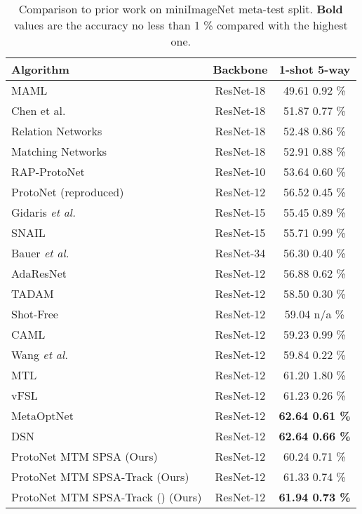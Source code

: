 \documentclass{article}
\begin{document}
\begin{table*}[th]
	\caption{Comparison to prior work on miniImageNet meta-test split. {\bf Bold} values are the accuracy no less than 1 \% compared with the highest one.} 
	\label{table:all-mini-imagenet}
	\begin{center}
		\begin{tabular}{|p{6.5 cm}|c|c|}
			\hline
			Algorithm & Backbone & 1-shot 5-way \\
			\hline
 			MAML~\cite{finn2017model,chen2019closer} & \; ResNet-18 \; & 49.61  0.92 \% \\
 			Chen et al.~\cite{chen2019closer} & ResNet-18 & 51.87  0.77 \%  \\
 			Relation Networks~\cite{sung2018learning,chen2019closer} &  ResNet-18 & 52.48  0.86 \%  \\
 			Matching Networks~\cite{vinyals2016matching,chen2019closer} & ResNet-18 & 52.91  0.88 \%  \\
			RAP-ProtoNet~\cite{hong2021reinforced} & ResNet-10 & 53.64  0.60 \% \\
ProtoNet (reproduced)~\cite{NIPS2017_cb8da676} & ResNet-12 & 56.52  0.45 \%  \\
 			Gidaris  {\it et al.}~\cite{gidaris2018dynamic} & ResNet-15 & 55.45  0.89 \% \\
			SNAIL~\cite{mishra2017simple} & ResNet-15 &  55.71  0.99 \% \\
			Bauer  {\it et al.}~\cite{bauer2017discriminative} & ResNet-34 &  56.30  0.40 \%  \\
			AdaResNet~\cite{munkhdalai2018rapid} & ResNet-12 &  56.88  0.62 \%  \\
			TADAM~\cite{NEURIPS2018_66808e32} & ResNet-12 &  58.50  0.30 \% \\
			Shot-Free~\cite{ravichandran2019few} & ResNet-12 &  59.04  n/a \%  \\
			CAML~\cite{jiang2018learning} & ResNet-12 &   59.23  0.99 \%  \\
			Wang {\it et al.}~\cite{wang2021bridging} & ResNet-12 &   59.84  0.22 \%  \\
			MTL~\cite{sun2019meta} & ResNet-12 & 61.20  1.80 \% \\
			vFSL~\cite{zhang2019variational} & ResNet-12 & 61.23  0.26 \%  \\
			MetaOptNet~\cite{8954109} & ResNet-12 &  \bf{62.64  0.61 \%}  \\
			DSN~\cite{simon2020adaptive} & ResNet-12 &  \bf{62.64  0.66} \%  \\
			\hline
			ProtoNet MTM SPSA (Ours) & ResNet-12 & 60.24  0.71 \%  \\
			ProtoNet MTM SPSA-Track (Ours) & ResNet-12 & 61.33  0.74 \%   \\
			ProtoNet MTM SPSA-Track () (Ours) & ResNet-12 & \; \bf{61.94  0.73 \%} \;  \\
			\hline
		\end{tabular}
	\end{center}
\end{table*}
\end{document}
